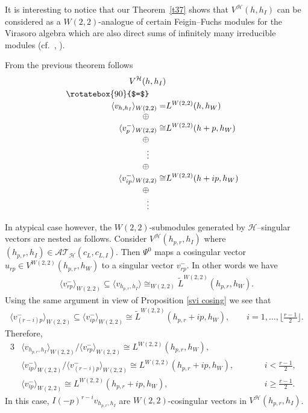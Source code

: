 \documentclass[pdftex]{sigma}
\numberwithin{equation}{section}
\newcommand{\HVir}{\mathcal H}
\begin{document}
\begin{Remark} \label{ff}
It is interesting to notice that our Theorem~\ref{t37} shows that $V^{\HVir}(h,h_I) $ can be considered as a $W(2,2)$-analogue of certain Feigin--Fuchs modules for the Virasoro algebra which are also direct sums of inf\/initely many irreducible modules (cf.\ \cite{FF}, \cite[Theorem~5.1]{AdM1}).
\end{Remark}

From the previous theorem follows
\begin{align*}
V^{\HVir}(h,h_I) \\
\rotatebox{90}{$=$} \qquad & \\[-1mm]
\langle v_{h,h_I} \rangle_{W(2,2)} =& L^{W(2,2)}(h,h_W) \\[-1mm]
\oplus\qquad & \\[-1mm]
\langle v_p^- \rangle_{W(2,2)} \cong& L^{W(2,2)}(h+p,h_W) \\[-1mm]
\oplus\qquad & \\[-1mm]
\vdots \qquad & \\[-1mm]
\oplus\qquad & \\[-1mm]
\langle v_{ip}^- \rangle_{W(2,2)} \cong& L^{W(2,2)}(h+ip,h_W) \\[-1mm]
\oplus\qquad & \\[-1mm]
\vdots \qquad &
\end{align*}

In atypical case however, the $W(2,2)$-submodules generated by $\HVir$--singular vectors are nested as follows. Consider $V^{\HVir}(h_{p,r},h_I)$ where $(h_{p,r},h_I) \in {\mathcal {AT} }_{\HVir} ( c_L, c_{L,I} ) $. Then $\Psi^{0}$ maps a cosingular vector $u_{rp}\in V^{W(2,2)}(h_{p,r},h_W)$ to a singular vector $v_{rp}^-$. In other words we have
\begin{gather*}
\langle v_{rp}^- \rangle_{W(2,2)} \subseteq \langle v_{h_{p,r},h_I} \rangle \cong_{W(2,2)} \widetilde{L}^{W(2,2)}(h_{p,r},h_W).
\end{gather*}
Using the same argument in view of Proposition \ref{svi cosing} we see that
\begin{gather*}
\langle v_{(r-i)p}^- \rangle_{W(2,2)} \subseteq \langle v_{ip}^- \rangle_{W(2,2)} \cong \widetilde{L}^{W(2,2)}(h_{p,r}+ip,h_W), \qquad i=1,\ldots,\big\lfloor \frac{r-1}{2}\big\rfloor .
\end{gather*}
Therefore,
\begin{alignat*}{3}
&\langle v_{h_{p,r},h_I} \rangle_{W(2,2)} / \langle v_{rp}^- \rangle_{W(2,2)} \cong L^{W(2,2)}(h_{p,r},h_W), &&& \\
&\langle v_{ip}^- \rangle_{W(2,2)} / \langle v_{(r-i)p}^- \rangle_{W(2,2)} \cong L^{W(2,2)}(h_{p,r} + ip,h_W), \qquad & &i < \frac{r-1}{2},& \\
&\langle v_{ip}^- \rangle_{W(2,2)} \cong L^{W(2,2)}(h_{p,r} + ip,h_W),\qquad &&i \geq \frac{r-1}{2}.&
\end{alignat*}
In this case, $I(-p)^{r-i}v_{h_{p,r},h_I} $ are $W(2,2)$-cosingular vectors in $V^{\HVir}(h_{p,r},h_I)$.
\end{document}
